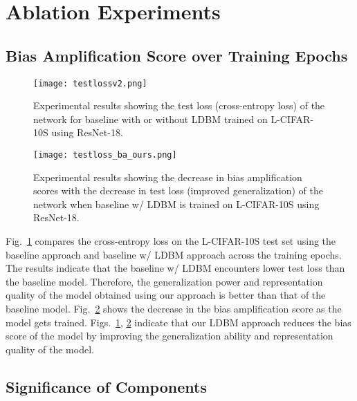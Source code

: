 \documentclass[10pt,twocolumn,letterpaper]{article}
\begin{document}
\section{Ablation Experiments}

\subsection{Bias Amplification Score over Training Epochs}\label{sec:ablgeneral}
\begin{figure}[t]
    \centering
     \texttt{[image: testlossv2.png]}
    \caption{Experimental results showing the test loss (cross-entropy loss) of the network for baseline with or without LDBM trained on L-CIFAR-10S using ResNet-18.}\label{fig:generalize}
\end{figure}

\begin{figure}[t]
    \centering
     \texttt{[image: testloss\_ba\_ours.png]}
    \caption{Experimental results showing the decrease in bias amplification scores with the decrease in test loss (improved generalization) of the network when baseline w/ LDBM is trained on L-CIFAR-10S using ResNet-18.}\label{fig:generalizebias}
\end{figure}

Fig.~\ref{fig:generalize} compares the cross-entropy loss on the L-CIFAR-10S test set using the baseline approach and baseline w/ LDBM approach across the training epochs. The results indicate that the baseline w/ LDBM encounters lower test loss than the baseline model. Therefore, the generalization power and representation quality of the model obtained using our approach is better than that of the baseline model. Fig.~\ref{fig:generalizebias} shows the decrease in the bias amplification score as the model gets trained. Figs.~\ref{fig:generalize}, \ref{fig:generalizebias} indicate that our LDBM approach reduces the bias score of the model by improving the generalization ability and representation quality of the model.



\subsection{Significance of Components}
\end{document}

